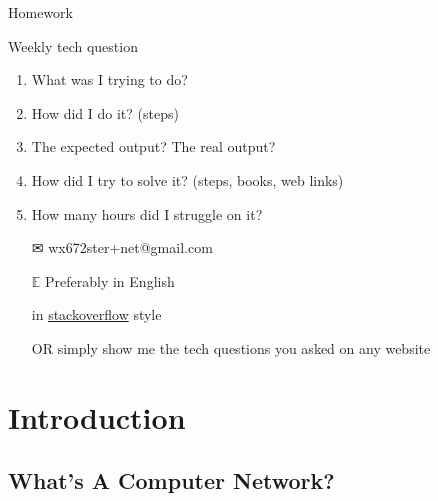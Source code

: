 \begin{frame}{{\hw\enspace}Homework}
  \begin{block}{Weekly tech question}
    \begin{enumerate}
    \item What was I trying to do?
    \item How did I do it? (steps)
    \item The expected output? The real output?
    \item How did I try to solve it? (steps, books, web links)
    \item How many hours did I struggle on it?
    \end{enumerate}
  \end{block}
  \begin{itemize}
  \item[\Large\dejavu ✉] \alert{\ttfamily wx672ster+net@gmail.com}
  \item[$\mathbb{E}$] Preferably in English
  \item[\stackoverflow] in
    \href{https://stackoverflow.com/questions/39199299/what-is-the-essential-difference-between-compound-command-and-normal-command-inlink}{stackoverflow}
    style
  \item[OR] simply show me the tech questions you asked on any website
  \end{itemize}  
\end{frame}

\section{Introduction}

\subsection[Definition]{What's A Computer Network?}

